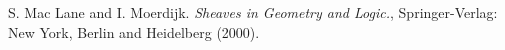 \documentclass[12pt]{article}
\begin{document}

%

\begin{thebibliography}{9}
S. Mac Lane and I. Moerdijk. {\em Sheaves in Geometry and Logic.}, Springer-Verlag:
New York, Berlin and Heidelberg (2000).
\end{thebibliography}

\end{document}
